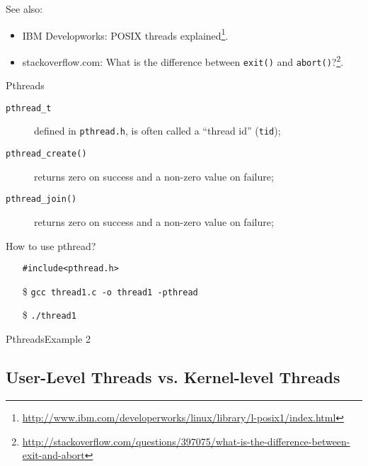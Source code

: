 See also:
\begin{itemize}
\item IBM Developworks: POSIX threads
  explained\footnote{\url{http://www.ibm.com/developerworks/linux/library/l-posix1/index.html}}.
\item stackoverflow.com: What is the difference between \texttt{exit()} and
  \texttt{abort()}?\footnote{\url{http://stackoverflow.com/questions/397075/what-is-the-difference-between-exit-and-abort}}.
\end{itemize}

\begin{frame}{Pthreads}
  \begin{description}
  \item[\texttt{pthread\_t}] defined in \texttt{pthread.h}, is often called a ``thread id''
    (\texttt{tid});
  \item[\texttt{pthread\_create()}] returns zero on success and a non-zero value on failure;
  \item[\texttt{pthread\_join()}] returns zero on success and a non-zero value on failure;
  \end{description}
  \begin{block}{How to use pthread?}
    \begin{itemize}
    \item[] \texttt{\#include<pthread.h>}
    \item[\$] \texttt{gcc thread1.c -o thread1 -pthread}
    \item[\$] \texttt{./thread1}
    \end{itemize}
  \end{block}
\end{frame}

\begin{frame}{Pthreads}{Example 2}
  \begin{center}
  \end{center}
\end{frame}


\subsection{User-Level Threads vs. Kernel-level Threads}
\label{sec:user-threads-vs}

